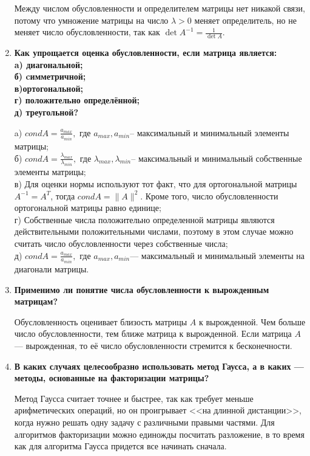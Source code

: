 \documentclass[12pt, a4paper]{article}
\begin{document}
\begin{enumerate}
Между числом обусловленности и определителем матрицы нет никакой связи, потому что умножение матрицы на число $ \lambda > 0 $ меняет определитель, но не меняет число обусловленности, так как $ \det A^{-1} = \frac{1}{\det A}. $


\item{\bf Как упрощается оценка обусловленности, если матрица является:\\
a) диагональной;\\
б) cимметричной;\\
в)ортогональной;\\
г) положительно определённой;\\
д) треугольной? }

a) $cond{A}=\frac{a_{max}}{a_{min}},$ где $a_{max},a_{min}$-- максимальный и минимальный элементы матрицы; \\
б) $cond{A}=\frac{\lambda_{max}}{\lambda_{min}},$ где $\lambda_{max},\lambda_{min}$-- максимальный и минимальный собственные элементы матрицы; \\
в) Для оценки нормы используют тот факт, что для ортогональной матрицы $A^{-1}=A^{T}$, тогда $cond{A}=\|A\|^2.$ Кроме того, число обусловленности ортогональной матрицы равно единице;\\
г) Собственные числа положительно определенной матрицы являются действительными положительными числами, поэтому в этом случае можно считать число обусловленности через собственные числа;\\
д) $cond{A}=\frac{a_{max}}{a_{min}},$ где $a_{max},a_{min}$--- максимальный и минимальный элементы на диагонали матрицы.


\item{\bf Применимо ли понятие числа обусловленности к вырожденным матрицам?}

Обусловленность оценивает близость матрицы $A$ к вырожденной. Чем больше число обусловленности, тем ближе матрица к вырожденной. Если матрица $A$ --- вырожденная, то её число обусловленности стремится к бесконечности.


\item{\bf В каких случаях целесообразно использовать метод Гаусса, а в каких --- методы, основанные на факторизации матрицы?}

Метод Гаусса считает точнее и быстрее, так как требует меньше арифметических операций, но он проигрывает <<на длинной дистанции>>, когда нужно решать одну задачу с различными правыми частями. Для алгоритмов факторизации можно единожды посчитать разложение, в то время как для алгоритма Гаусса придется все начинать сначала.




\end{enumerate}
\end{document}

